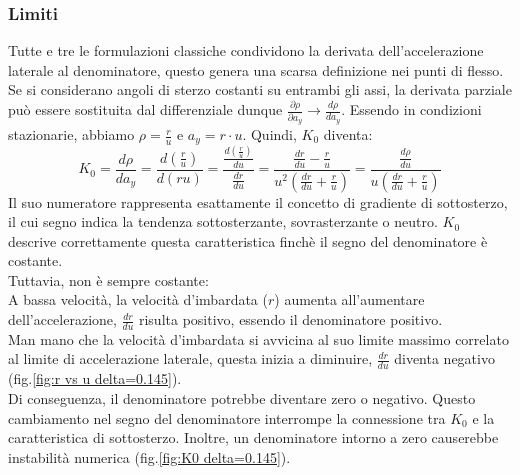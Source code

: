 \subsubsection{Limiti}
Tutte e tre le formulazioni classiche condividono la derivata dell'accelerazione laterale al denominatore, 
questo genera una scarsa definizione nei punti di flesso.\\
Se si considerano angoli di sterzo costanti su entrambi gli assi, la derivata parziale può essere sostituita dal 
differenziale dunque $\frac{\partial \rho}{\partial a_y} \longrightarrow{} \frac{d \rho}{da_y}$. Essendo in condizioni
stazionarie, abbiamo $\rho = \frac{r}{u}$ e $a_y = r \cdot u$. Quindi, $K_0$ diventa:
\begin{equation}
K_0 = 
\frac{d \rho}{da_y} = \frac{d \left( \frac{r}{u} \right)}{d(ru)} = \frac{\frac{d(\frac{r}{u})}{du}}{\frac{dr}{du}} =
\frac{\frac{dr}{du} - \frac{r}{u}}{u^2( \frac{dr}{du} + \frac{r}{u})} =
\frac{\frac{d \rho}{du}}{u( \frac{dr}{du} + \frac{r}{u})}
\end{equation}
Il suo numeratore rappresenta esattamente il concetto di gradiente di sottosterzo, il cui segno indica la tendenza
sottosterzante, sovrasterzante o neutro.
$K_0$ descrive correttamente questa caratteristica finchè il segno del denominatore è costante. \\
Tuttavia, non è sempre costante:\\
A bassa velocità, la velocità d'imbardata ($r$) aumenta all'aumentare dell'accelerazione, $\frac{dr}{du}$ risulta
positivo, essendo il denominatore positivo. \\
Man mano che la velocità d'imbardata si avvicina al suo limite massimo correlato al limite di accelerazione laterale,
questa inizia a diminuire, $\frac{dr}{du}$ diventa negativo (fig.\ref{fig:r vs u delta=0.145}).\\ 
Di conseguenza, il denominatore potrebbe diventare zero o negativo. Questo cambiamento nel segno del denominatore
interrompe la connessione tra $K_0$ e la caratteristica di sottosterzo. Inoltre, un denominatore intorno a zero causerebbe
instabilità numerica (fig.\ref{fig:K0 delta=0.145}).\\

